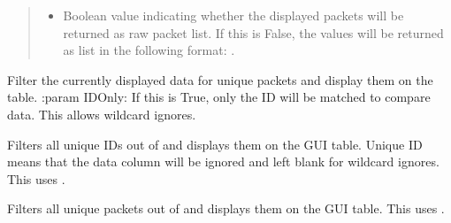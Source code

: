 \documentclass[letterpaper,10pt,english]{sphinxmanual}
\begin{document}
\begin{fulllineitems}
\begin{fulllineitems}
\begin{quote}
\begin{description}
\begin{itemize}
\item {} 
 \textendash{} Boolean value indicating whether the displayed packets will be returned
as raw packet list. If this is False, the values will be returned as list
in the following format: .

\end{itemize}

\end{description}\end{quote}

\end{fulllineitems}


\begin{fulllineitems}
\label{\detokenize{src:src.PacketsDialog.PacketsDialog.displayUniquePackets}}
Filter the currently displayed data for unique packets and display them on the table.
:param IDOnly: If this is True, only the ID will be matched to compare data. This allows wildcard ignores.

\end{fulllineitems}


\begin{fulllineitems}
\label{\detokenize{src:src.PacketsDialog.PacketsDialog.getUniqueIDs}}
Filters all unique IDs out of  and displays them on the GUI table.
Unique ID means that the data column will be ignored and left blank for wildcard ignores.
This uses {\hyperref[\detokenize{src:src.PacketsDialog.PacketsDialog.displayUniquePackets}]{}}.

\end{fulllineitems}


\begin{fulllineitems}
\label{\detokenize{src:src.PacketsDialog.PacketsDialog.getUniquePackets}}
Filters all unique packets out of  and displays them on the GUI table.
This uses {\hyperref[\detokenize{src:src.PacketsDialog.PacketsDialog.displayUniquePackets}]{}}.


\end{fulllineitems}
\end{fulllineitems}
\end{document}
